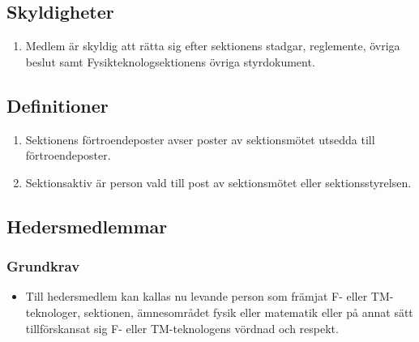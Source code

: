 \documentclass[11pt,a4paper]{article}
\begin{document}
\subsection{Skyldigheter}
\begin{enumerate}[\thesubsection.1]

  \item Medlem är skyldig att rätta sig efter sektionens stadgar,
   regle\-mente, övriga beslut samt Fysikteknologsektionens övriga styrdokument.

\end{enumerate}



\subsection{Definitioner}
\begin{enumerate}[\thesubsection.1]

  \item Sektionens förtroendeposter avser poster av sektionsmötet utsedda till förtroendeposter.

  \item Sektionsaktiv är person vald till post av sektionsmötet eller sektionsstyrelsen.

\end{enumerate}



\subsection{Hedersmedlemmar}
\subsubsection{Grundkrav}
\begin{itemize}

  \item Till hedersmedlem kan kallas nu levande person som främjat
  F- eller TM-tekno\-loger, sektionen, ämnesområdet fysik eller matematik eller på annat sätt till\-för\-skansat
  sig F- eller TM-tekno\-logens vördnad och respekt.

\end{itemize}
\end{document}
